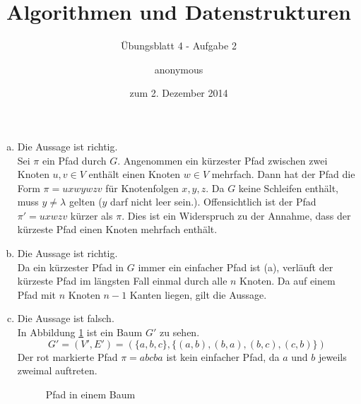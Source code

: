 \documentclass[a4paper]{scrartcl}
\title{Algorithmen und Datenstrukturen}
\subtitle{Übungsblatt 4 - Aufgabe 2}
\author{
    anonymous
}
\date{zum 2. Dezember 2014}
\begin{document}
\maketitle

\begin{enumerate}[(a)]
    \item
        Die Aussage ist richtig. \\
        Sei $\pi$ ein Pfad durch $G$.
        Angenommen ein kürzester Pfad zwischen zwei Knoten $u,v \in V$ enthält
        einen Knoten $w \in V$ mehrfach.
        Dann hat der Pfad die Form $\pi = uxwywzv$ für Knotenfolgen $x, y, z$.
        Da $G$ keine Schleifen enthält, muss $y \neq \lambda$ gelten
        ($y$ darf nicht leer sein.).
        Offensichtlich ist der Pfad $\pi' = uxwzv$ kürzer als $\pi$.
        Dies ist ein Widerspruch zu der Annahme, dass der kürzeste Pfad einen
        Knoten mehrfach enthält.

    \item
        Die Aussage ist richtig. \\
        Da ein kürzester Pfad in $G$ immer ein einfacher Pfad ist (a), verläuft
        der kürzeste Pfad im längsten Fall einmal durch alle $n$ Knoten.
        Da auf einem Pfad mit $n$ Knoten $n-1$ Kanten liegen, gilt die Aussage.

    \item
        Die Aussage ist falsch. \\
        In Abbildung \ref{fig:tree-path} ist ein Baum $G'$ zu sehen.
        \begin{equation}
            G' = (V', E') = \left( \{a,b,c\}, \{ (a,b), (b,a), (b,c), (c,b) \} \right)
        \end{equation}
        Der rot markierte Pfad $\pi = abcba$ ist kein einfacher Pfad, da $a$
        und $b$ jeweils zweimal auftreten.
        \begin{figure}[h]
            \centering
            \caption{Pfad in einem Baum}
            \label{fig:tree-path}
        \end{figure}


\end{enumerate}
\end{document}
